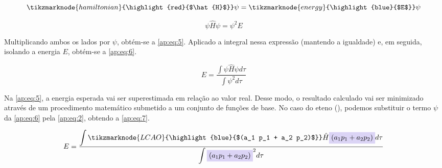 
\begin{figure}[htb]
    \vspace{2\baselineskip}
\begin{equation}
\label{ap:eq:4}
    \tikzmarknode{hamiltonian}{\highlight{red}{$\hat{H}$}} \psi = \tikzmarknode{energy}{\highlight{blue}{$E$}} \psi
\end{equation}
\end{figure}

\begin{equation}
\label{ap:eq:5}
    \psi \hat{H} \psi = \psi^2 E
\end{equation}


Multiplicando ambos os lados por $\psi$, obtém-se a \autoref{ap:eq:5}. Aplicado a integral nessa expressão (mantendo a igualdade) e, em seguida, isolando a energia $E$, obtém-se a \autoref{ap:eq:6}.

\begin{equation}
\label{ap:eq:6}
    E = \frac{\displaystyle \int \psi \hat{H} \psi d\tau}{\displaystyle \int \psi^2 d\tau}
\end{equation}

Na \autoref{ap:eq:5}, a energia esperada vai ser superestimada em relação ao valor real. Desse modo, o resultado calculado vai ser minimizado através de um procedimento matemático submetido a um conjunto de funções de base. No caso do eteno (), podemos substituir o termo $\psi$ da \autoref{ap:eq:6} pela \autoref{ap:eq:2}, obtendo a \autoref{ap:eq:7}.

\begin{figure}[htb]
    \vspace{2\baselineskip}
\begin{equation}
\label{ap:eq:7}
    E = \frac{\displaystyle \int \tikzmarknode{LCAO}{\highlight{blue}{$(a_1 p_1 + a_2 p_2)$}} \hat{H} \highlight{blue}{$(a_1 p_1 + a_2 p_2)$} d\tau}{\displaystyle \int \highlight{blue}{$(a_1 p_1 + a_2 p_2)$}^2 d\tau}
\end{equation}
\end{figure}

